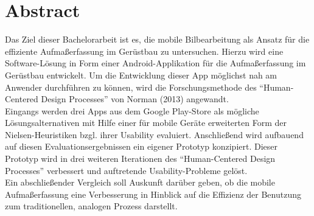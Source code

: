 \chapter*{\centering Abstract}
Das Ziel dieser Bachelorarbeit ist es, die mobile Bilbearbeitung als Ansatz für die effiziente Aufmaßerfassung im Gerüstbau zu untersuchen.
Hierzu wird eine Software-Lösung in Form einer Android-Applikation für die Aufmaßerfassung im Gerüstbau entwickelt.
Um die Entwicklung dieser App möglichst nah am Anwender durchführen zu können, wird die Forschungsmethode des ``Human-Centered Design Processes'' von Norman (2013) angewandt. \\

Eingangs werden drei Apps aus dem Google Play-Store als mögliche Lösungsalternativen mit Hilfe einer für mobile Geräte erweiterten Form der Nielsen-Heuristiken bzgl. ihrer Usability evaluiert.
Anschließend wird aufbauend auf diesen Evaluationsergebnissen ein eigener Prototyp konzipiert.
Dieser Prototyp wird in drei weiteren Iterationen des ``Human-Centered Design Processes'' verbessert und auftretende Usability-Probleme gelöst.  \\

Ein abschließender Vergleich soll Auskunft darüber geben, ob die mobile Aufmaßerfassung eine Verbesserung in Hinblick auf die Effizienz der Benutzung zum traditionellen, analogen Prozess darstellt.
